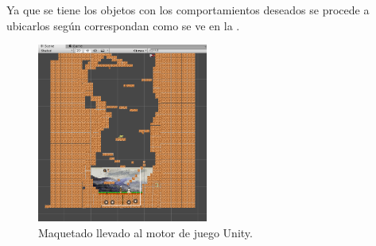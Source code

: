 Ya que se tiene los objetos con los comportamientos deseados se procede a ubicarlos según correspondan como se ve en la \cite{fig:n04}.
\begin{figure}
	\centering
	\caption{Maquetado llevado al motor de juego Unity.}
	\label{fig:n04}
	\includegraphics[width=0.5\textwidth]{03TrabajoRealizado/DocProduccionR/imagenes/n3/n301.png}
\end{figure}

